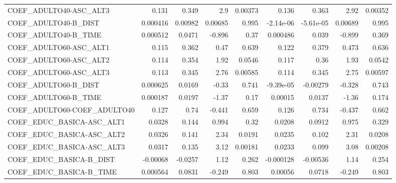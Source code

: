 \begin{tabular}{lrrrrrrrr}
COEF\_ADULTO40-ASC\_ALT3            &       0.131 &        0.349 &     2.9 &  0.00373 &      0.136 &       0.363 &         2.92 &       0.00352 \\
COEF\_ADULTO40-B\_DIST              &    0.000416 &      0.00982 & 0.00685 &    0.995 &  -2.14e-06 &   -5.61e-05 &      0.00689 &         0.995 \\
COEF\_ADULTO40-B\_TIME              &    0.000512 &       0.0471 &  -0.896 &     0.37 &   0.000486 &       0.039 &       -0.899 &         0.369 \\
COEF\_ADULTO60-ASC\_ALT1            &       0.115 &        0.362 &    0.47 &    0.639 &      0.122 &       0.379 &        0.473 &         0.636 \\
COEF\_ADULTO60-ASC\_ALT2            &       0.114 &        0.354 &    1.92 &   0.0546 &      0.117 &        0.36 &         1.93 &        0.0542 \\
COEF\_ADULTO60-ASC\_ALT3            &       0.113 &        0.345 &    2.76 &  0.00585 &      0.114 &       0.345 &         2.75 &       0.00597 \\
COEF\_ADULTO60-B\_DIST              &    0.000625 &       0.0169 &   -0.33 &    0.741 &  -9.39e-05 &    -0.00279 &       -0.328 &         0.743 \\
COEF\_ADULTO60-B\_TIME              &    0.000187 &       0.0197 &   -1.37 &     0.17 &    0.00015 &      0.0137 &        -1.36 &         0.174 \\
COEF\_ADULTO60-COEF\_ADULTO40       &       0.127 &         0.74 &  -0.441 &    0.659 &      0.126 &       0.734 &       -0.437 &         0.662 \\
COEF\_EDUC\_BASICA-ASC\_ALT1         &      0.0328 &        0.144 &   0.994 &     0.32 &     0.0208 &      0.0912 &        0.975 &         0.329 \\
COEF\_EDUC\_BASICA-ASC\_ALT2         &      0.0326 &        0.141 &    2.34 &   0.0191 &     0.0235 &       0.102 &         2.31 &        0.0208 \\
COEF\_EDUC\_BASICA-ASC\_ALT3         &      0.0317 &        0.135 &    3.12 &  0.00181 &     0.0233 &       0.099 &         3.08 &       0.00208 \\
COEF\_EDUC\_BASICA-B\_DIST           &    -0.00068 &      -0.0257 &    1.12 &    0.262 &  -0.000128 &    -0.00536 &         1.14 &         0.254 \\
COEF\_EDUC\_BASICA-B\_TIME           &    0.000564 &       0.0831 &  -0.249 &    0.803 &    0.00056 &      0.0718 &       -0.249 &         0.803 \\

\end{tabular}
